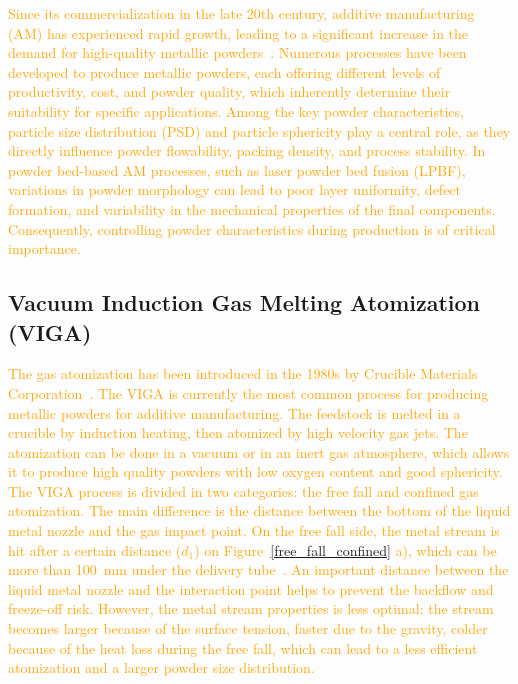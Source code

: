 \documentclass[../../../main.tex]{subfiles}
\begin{document}
\textcolor{orange}{
Since its commercialization in the late 20th century, additive manufacturing (AM) has experienced rapid growth, leading to a significant increase in the demand for high-quality metallic powders~\cite{Feng2024PreparationAdditive}. Numerous processes have been developed to produce metallic powders, each offering different levels of productivity, cost, and powder quality, which inherently determine their suitability for specific applications.
Among the key powder characteristics, particle size distribution (PSD) and particle sphericity play a central role, as they directly influence powder flowability, packing density, and process stability. In powder bed-based AM processes, such as laser powder bed fusion (LPBF), variations in powder morphology can lead to poor layer uniformity, defect formation, and variability in the mechanical properties of the final components. Consequently, controlling powder characteristics during production is of critical importance.}

\subsection{Vacuum Induction Gas Melting Atomization (VIGA)}

\textcolor{orange}{
The gas atomization has been introduced in the 1980s by Crucible Materials Corporation~\cite{Jang2020PowderBased}. The VIGA is currently the most common process for producing metallic powders for additive manufacturing. The feedstock is melted in a crucible by induction heating, then atomized by high velocity gas jets. The atomization can be done in a vacuum or in an inert gas atmosphere, which allows it to produce high quality powders with low oxygen content and good sphericity. The VIGA process is divided in two categories: the free fall and confined gas atomization. The main difference is the distance between the bottom of the liquid metal nozzle and the gas impact point. On the free fall side, the metal stream is hit after a certain distance ($d_{1}$) on Figure~\ref{free_fall_confined} a), which can be more than 100~mm under the delivery tube~\cite{Kassym2020AtomizationProcesses}. An important distance between the liquid metal nozzle and the interaction point helps to prevent the backflow and freeze-off risk. However, the metal stream properties is less optimal: the stream becomes larger because of the surface tension, faster due to the gravity, colder because of the heat loss during the free fall, which can lead to a less efficient atomization and a larger powder size distribution. }
\end{document}
